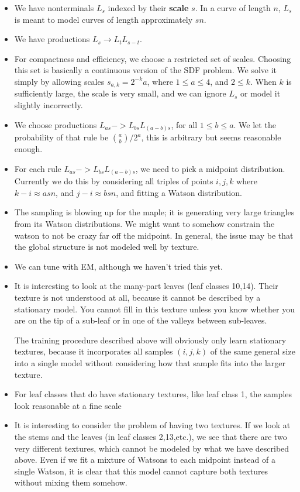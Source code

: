 \documentclass{book}
\begin{document}
\begin{itemize}
\item We have nonterminals $L_s$ indexed by their \textbf{scale} $s$. In a
    curve of length $n$, $L_s$ is meant to model curves of length
    approximately $sn$.
\item We have productions $L_s \to L_t L_{s-t}$.
\item For compactness and efficiency, we choose a restricted set of
    scales. Choosing this set is basically a continuous version of the
    SDF problem. We solve it simply by allowing scales $s_{a,k}
    =2^{-k}a$, where $1\le a\le 4$, and $2\le k$. When $k$ is
    sufficiently large, the scale is very small, and we can ignore
    $L_s$ or model it slightly incorrectly.
\item We choose productions $L_{as} -> L_{bs}L_{(a-b)s}$,
    for all $1 \le b \le a$. We let the probability of that rule be
    ${a \choose b}/2^a$, this is arbitrary but seems reasonable
    enough.
\item For each rule $L_{as} -> L_{bs}L_{(a-b)s}$, we need to pick a
    midpoint distribution. Currently we do this by considering all
    triples of points $i,j,k$ where $k-i \approx asn$, and $j-i
    \approx bsn$, and fitting a Watson distribution.
\item The sampling is blowing up for the maple; it is generating very
    large triangles from its Watson distributions. We might want to
    somehow constrain the watson to not be crazy far off the
    midpoint. In general, the issue may be that the global structure
    is not modeled well by texture.
\item We can tune with EM, although we haven't tried this yet.
\item It is interesting to look at the many-part leaves (leaf classes
    10,14). Their texture is not understood at all, because it cannot
    be described by a stationary model. You cannot fill in this
    texture unless you know whether you are on the tip of a sub-leaf
    or in one of the valleys between sub-leaves.

    The training procedure described above will obviously only learn
    stationary textures, because it incorporates all samples $(i,j,k)$
    of the same general size into a single model without considering
    how that sample fits into the larger texture.
\item For leaf classes that do have stationary textures, like leaf class
    1, the samples look reasonable at a fine scale
\item It is interesting to consider the problem of having two
    textures. If we look at the stems and the leaves (in leaf classes
    2,13,etc.), we see that there are two very different textures,
    which cannot be modeled by what we have described above. Even if
    we fit a mixture of Watsons to each midpoint instead of a single
    Watson, it is clear that this model cannot capture both textures
    without mixing them somehow.


\end{itemize}
\end{document}
